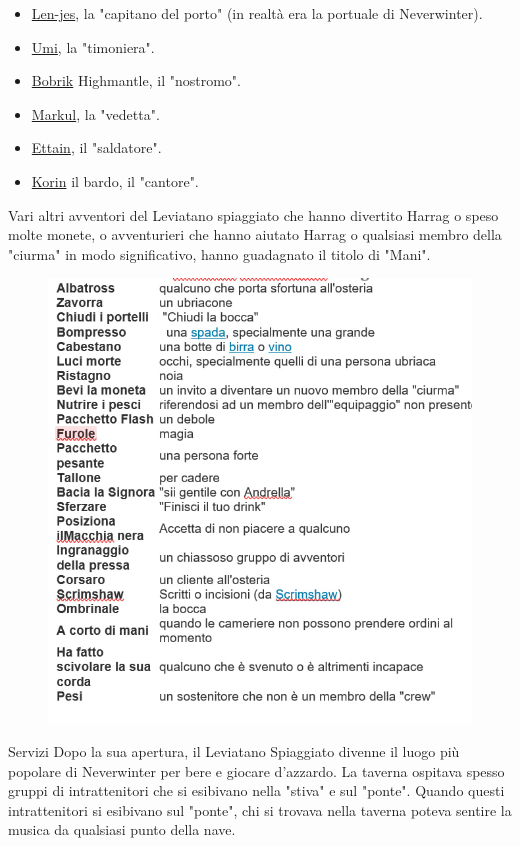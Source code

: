 \documentclass{article}
\begin{document}
\begin{itemize}
    \item \hyperlink{len}{Len-jes}, la "capitano del porto" (in realtà era la portuale di Neverwinter).
    \item \hyperlink{umi}{Umi}, la "timoniera".
    \item \hyperlink{bob}{Bobrik} Highmantle, il "nostromo".
    \item \hyperlink{mark}{Markul}, la "vedetta".
    \item \hyperlink{et}{Ettain}, il "saldatore".
    \item \hyperlink{kor}{Korin} il bardo, il "cantore".
\end{itemize}

Vari altri avventori del Leviatano spiaggiato che hanno divertito Harrag o speso molte monete, o avventurieri che hanno aiutato Harrag o qualsiasi membro della "ciurma" in modo significativo, hanno guadagnato il titolo di "Mani".

\begin{figure}[h]
    \centering
     \includegraphics[width= 15cm,height = 12 cm ]{../Utilita/linguaggiodelLeviatanoSpiaggiato.jpg}
\end{figure}

Servizi\newline
Dopo la sua apertura, il Leviatano Spiaggiato divenne il luogo più popolare di Neverwinter per bere e giocare d'azzardo. La taverna ospitava spesso gruppi di intrattenitori che si esibivano nella "stiva" e sul "ponte". Quando questi intrattenitori si esibivano sul "ponte", chi si trovava nella taverna poteva sentire la musica da qualsiasi punto della nave.
\end{document}
